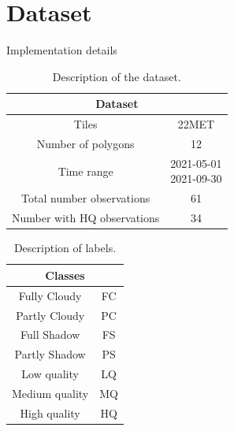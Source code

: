 \documentclass{beamer}
\begin{document}
\section{Dataset}
\begin{frame}{Implementation details}
    \begin{minipage}{0.6\textwidth}
        \begin{table}
            \scriptsize
            \begin{tabular}{c|c}
                \hline
                \multicolumn{2}{c}{\textbf{Dataset}} \\
                \hline  	
                Tiles &  22MET \\
                Number of polygons & 12 \\
                Time range & \makecell{2021-05-01 \\ 2021-09-30} \\
                Total number observations & 61\\
                Number with HQ observations & 34 \\
                \hline
            \end{tabular}
            \caption{Description of the dataset.}
        \end{table}
    \end{minipage}
    \begin{minipage}{0.35\textwidth}
        \begin{table}
            \scriptsize
            \begin{tabular}{c|c}
            \hline
                \multicolumn{2}{c}{\textbf{Classes}} \\ \hline
                Fully Cloudy & FC \\
                Partly Cloudy& PC \\
                Full Shadow & FS \\
                Partly Shadow& PS \\
                Low quality & LQ \\
                Medium quality & MQ\\
                High quality & HQ \\
                \hline
            \end{tabular}
            \caption{Description of labels.}
        \end{table}
    \end{minipage}
\end{frame}
\end{document}
